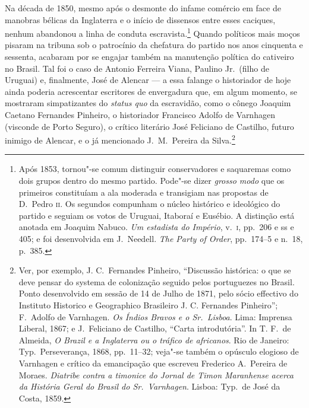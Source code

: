 Na década de 1850, mesmo após o desmonte do infame comércio em face de
manobras bélicas da Inglaterra e o início de dissensos entre esses
caciques, nenhum abandonou a linha de conduta escravista.\footnote{ Após 1853, 
tornou"-se comum distinguir conservadores e saquaremas como
dois grupos dentro do mesmo partido. Pode"-se dizer \textit{grosso
modo} que os primeiros constituíam a ala moderada e transigiam nas
propostas de D.~Pedro \textsc{ii}. Os segundos compunham o núcleo histórico e
ideológico do partido e seguiam os votos de Uruguai, Itaboraí e
Eusébio. A distinção está anotada em Joaquim Nabuco. \textit{Um
estadista do Império}, v.~\textsc{i}, pp.~206 e ss e 405; e foi desenvolvida em
J.~Needell. \textit{The Party of Order}, pp.~174--5 e n.~18, p.~385.} 
Quando políticos mais moços pisaram na tribuna sob o patrocínio da
chefatura do partido nos anos cinquenta e sessenta, acabaram por se
engajar também na manutenção política do cativeiro no Brasil. Tal foi o
caso de Antonio Ferreira Viana, Paulino Jr.~(filho de Uruguai) e,
finalmente, José de Alencar --- a essa falange o historiador de hoje
ainda poderia acrescentar escritores de envergadura que, em algum
momento, se mostraram simpatizantes do \textit{status quo} da
escravidão, como o cônego Joaquim Caetano Fernandes Pinheiro, o
historiador Francisco Adolfo de Varnhagen (visconde de Porto Seguro), o
crítico literário José Feliciano de Castilho, futuro inimigo de
Alencar, e o já mencionado J.~M.~Pereira da Silva.\footnote{ Ver, por exemplo, J. C.~Fernandes Pinheiro, 
``Discussão histórica: o que se deve pensar do systema de colonização seguido pelos portuguezes no Brasil. 
Ponto desenvolvido em sessão de 14 de Julho de 1871, pelo sócio effectivo do Instituto Historico e 
Geographico Brasileiro J. C. Fernandes Pinheiro''; F.~Adolfo de Varnhagen. \textit{Os Índios Bravos 
e o Sr.~Lisboa}. Lima: Imprensa Liberal, 1867; e J.~Feliciano de Castilho, ``Carta introdutória''. 
In T. F.~de Almeida, \textit{O Brazil e a Inglaterra ou o tráfico de africanos}. Rio de Janeiro: Typ.~Perseverança, 
1868, pp.~11--32; veja"-se também o opúsculo elogioso de Varnhagen e crítico da emancipação que escreveu 
Frederico A.~Pereira de Moraes. \textit{Diatribe contra a timonice do Jornal de Timon Maranhense acerca da 
História Geral do Brasil do Sr.~Varnhagen}. Lisboa: Typ.~de José da Costa, 1859.}  

